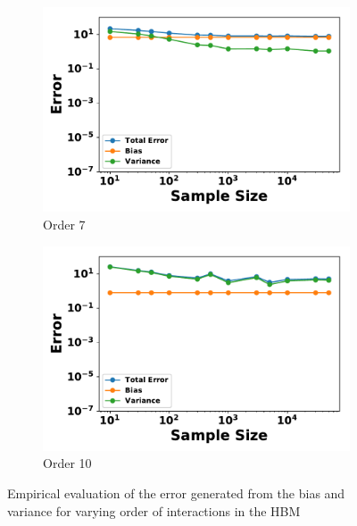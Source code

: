 \documentclass[letterpaper]{article} %
\begin{document}
\begin{figure}[p]
\begin{subfigure}[b]{0.245\textwidth}
              \includegraphics[width=\textwidth]{./HBM_Error_vs_Samples_Order7-eps-converted-to.pdf}
              \caption{Order 7}
          \end{subfigure}
          \begin{subfigure}[b]{0.245\textwidth}
              \centering
              \includegraphics[width=\textwidth]{./HBM_Error_vs_Samples_Order10-eps-converted-to.pdf}
              \caption{Order 10}
          \end{subfigure}
          \caption{Empirical evaluation of the error generated from the bias and variance for varying order of interactions in the HBM} \label{fig:HBM_sample_size}
        \end{figure}
        
        
        
\end{document}
